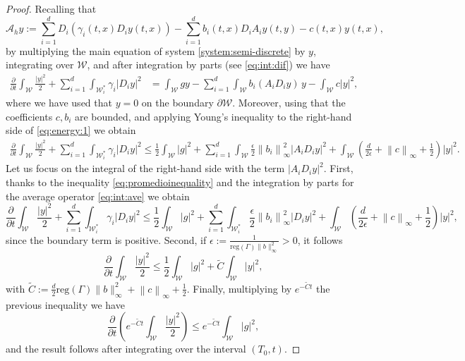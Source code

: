 \documentclass[10pt,a4paper]{amsart}
\begin{document}
\begin{proof} Recalling that 
\begin{equation}
\mathcal{A}_{h}y:= \sum_{i=1}^{d}D_{i}\left(\gamma_{i}(t,x)D_{i}y(t,x)\right)-\sum_{i=1}^{d}b_i(t,x)D_{i}A_{i}y(t,y)-c(t,x)y(t,x),
\end{equation}
by multiplying the main equation of system \eqref{system:semi-discrete} by $y$, integrating over $\mathcal{W}$, and after integration by parts (see \eqref{eq:int:dif}) we have
\begin{align}\label{eq:energy:1}
\frac{\partial}{\partial t}\int_\mathcal{W} \frac{|y|^2}{2}+\sum_{i=1}^d\int_{\mathcal{W}_i^\ast} \gamma_i|D_iy|^2&=\int_\mathcal{W} g y-\sum_{i=1}^d\int_{\mathcal{W}} b_i(A_iD_iy)\,y-\int_{\mathcal{W}}c|y|^2,
\end{align}
where we have used that $y=0$ on the boundary $\partial\mathcal{W}$. Moreover, using that the coefficients $c,b_i$ are bounded, and applying Young's inequality to the right-hand side of \eqref{eq:energy:1} we obtain
        \begin{align*}
        \frac{\partial}{\partial t}\int_\mathcal{W} \frac{|y|^2}{2}+\sum_{i=1}^d\int_{\mathcal{W}_i^\ast} \gamma_i|D_{i}y|^{2}\leq\frac{1}{2}\int_\mathcal{W}|g|^{2}+\sum_{i=1}^d\int_{\mathcal{W}}\frac{\epsilon}{2}\left\| b_{i}\right\|_{\infty}^{2}|A_{i}D_{i}y|^{2}+\int_{\mathcal{W}}\left( \frac{d}{2\epsilon}+\left\| c\right\|_{\infty}+\frac{1}{2}\right)|y|^{2}. 
    \end{align*}
    Let us focus on the integral of the right-hand side with the term $|A_{i}D_{i}y|^{2}$. First, thanks to the inequality \eqref{eq:promedioinequality} and the integration by parts for the average operator \eqref{eq:int:ave} we obtain
    \begin{equation*}
        \frac{\partial}{\partial t}\int_\mathcal{W} \frac{|y|^2}{2}+\sum_{i=1}^d\int_{\mathcal{W}_i^\ast} \gamma_i|D_{i}y|^{2}\leq\frac{1}{2}\int_\mathcal{W}|g|^{2}+\sum_{i=1}^d\int_{\mathcal{W}^{\ast}_{i}}\frac{\epsilon}{2}\left\| b_{i}\right\|_{\infty}^{2}|D_{i}y|^{2}+\int_{\mathcal{W}}\left(\frac{d}{2\epsilon}+\left\| c\right\|_{\infty}+\frac{1}{2}\right)|y|^{2},
    \end{equation*}
since the boundary term is positive. Second, if $\epsilon:= \frac{1}{\mbox {reg}(\Gamma)\|b\|^2_\infty}>0$, it follows 
       \begin{equation*}
        \frac{\partial}{\partial t}\int_\mathcal{W} \frac{|y|^2}{2}\leq\frac{1}{2}\int_\mathcal{W}|g|^{2}+\tilde{C}\int_{\mathcal{W}}|y|^{2},
    \end{equation*}
    with $\tilde{C}:= \frac{d}{2}\mbox {reg}(\Gamma)\|b\|^2_\infty+\left\| c\right\|_{\infty}+\frac{1}{2}$. Finally, multiplying by $e^{-\tilde{C}t}$ the previous inequality we have
        \begin{equation*}
        \frac{\partial}{\partial t}\left( e^{-\tilde{C}t}\int_\mathcal{W} \frac{|y|^2}{2}\right)\leq e^{-\tilde{C}t}\int_\mathcal{W}|g|^{2},
    \end{equation*}
    and the result follows after integrating over the interval $(T_{0},t)$.
\end{proof}
\end{document}
